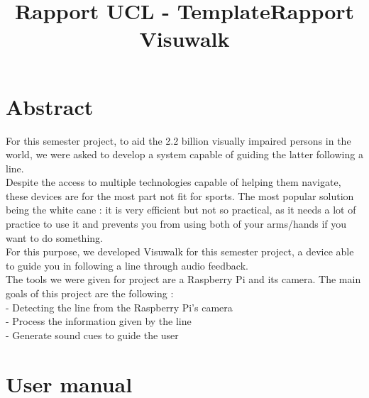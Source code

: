 \documentclass{rapport}
\title{Rapport UCL - Template} %
\title{Rapport Visuwalk} %
\begin{document}



        
\fairemarges %
\fairepagedegarde %
\tableofcontents%
\newpage

\section{Abstract}


For this semester project, to aid the 2.2 billion visually impaired persons in the world, we were asked to develop a system capable of guiding the latter following a line.\\ Despite the access to multiple technologies capable of helping them navigate, these devices are for the most part not fit for sports. The most popular solution being the white cane : it is very efficient but not so practical, as it needs a lot of practice to use it and prevents you from using both of your arms/hands if you want to do something.\\For this purpose, we developed Visuwalk for this semester project, a device able to guide you in following a line through audio feedback.\\
The tools we were given for project are a Raspberry Pi and its camera. The main goals of this project are the following :\\
- Detecting the line from the Raspberry Pi’s camera\\
- Process the information given by the line\\
- Generate sound cues to guide the user

\section {User manual}
\end{document}
